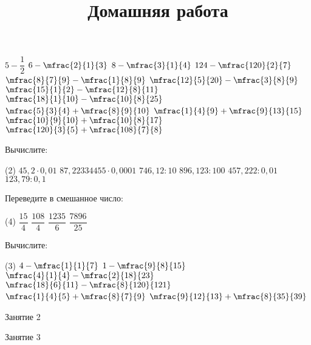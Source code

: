 \begin{class}[number=1]
\begin{listofex}
\begin{tasks}
			\task \( 5-\dfrac{1}{2} \)
			\task \( 6-\mfrac{2}{1}{3} \)
			\task \( 8-\mfrac{3}{1}{4} \)
			\task \( 124-\mfrac{120}{2}{7} \)
			\task \( \mfrac{8}{7}{9}-\mfrac{1}{8}{9} \)
			\task \( \mfrac{12}{5}{20}-\mfrac{3}{8}{9} \)
			\task \( \mfrac{15}{1}{2}-\mfrac{12}{8}{11} \)
			\task \( \mfrac{18}{1}{10}-\mfrac{10}{8}{25} \)
			\task \( \mfrac{5}{3}{4}+\mfrac{8}{9}{10} \)
			\task \( \mfrac{1}{4}{9}+\mfrac{9}{13}{15} \)
			\task \( \mfrac{10}{9}{10}+\mfrac{10}{8}{17} \)
			\task \( \mfrac{120}{3}{5}+\mfrac{108}{7}{8} \)
		\end{tasks}
	\end{listofex}
	\newpage
	\title{Домашняя работа}
	\begin{listofex}
		\item Вычислите:
		\begin{tasks}(2)
			\task \( 45,2\cdot0,01 \)
			\task \( 87,22334455\cdot0,0001 \)
			\task \( 746,12:10 \)
			\task \( 896,123:100 \)
			\task \( 457,222:0,01 \)
			\task \( 123,79:0,1 \)
		\end{tasks}
		\item Переведите в смешанное число:
		\begin{tasks}(4)
			\task \( \dfrac{15}{4} \)
			\task \( \dfrac{108}{4} \)
			\task \( \dfrac{1235}{6} \)
			\task \( \dfrac{7896}{25} \)
		\end{tasks}
		\item Вычислите:
		\begin{tasks}(3)
			\task \( 4-\mfrac{1}{1}{7} \)
			\task \( 1-\mfrac{9}{8}{15} \)
			\task \( \mfrac{4}{1}{4}-\mfrac{2}{18}{23} \)
			\task \( \mfrac{18}{6}{11}-\mfrac{8}{120}{121} \)
			\task \( \mfrac{1}{4}{5}+\mfrac{8}{7}{9} \)
			\task \( \mfrac{9}{12}{13}+\mfrac{8}{35}{39} \)
		\end{tasks}
	\end{listofex}
\end{class}

\begin{class}[number=2]
	\begin{listofex}
		\item Занятие 2
	\end{listofex}
\end{class}

\begin{class}[number=3]
	\begin{listofex}
		\item Занятие 3 
	\end{listofex}
\end{class}

